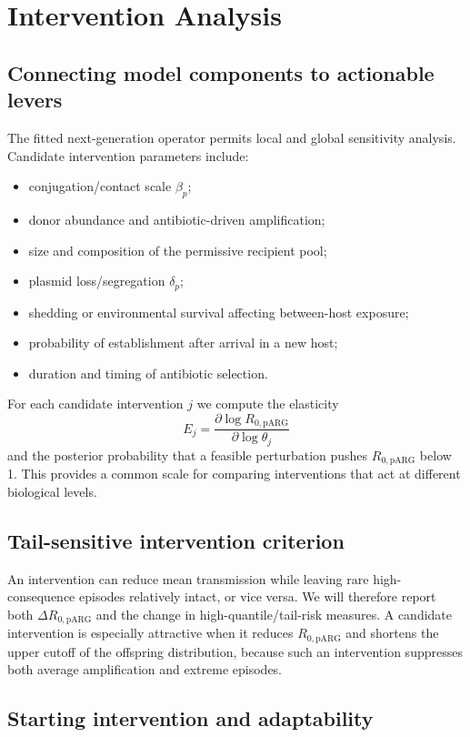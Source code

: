 \documentclass[12pt,a4paper]{article}
\newcommand{\RpARG}{R_{0,\mathrm{pARG}}}
\begin{document}
\section{Intervention Analysis}

\subsection{Connecting model components to actionable levers}

The fitted next-generation operator permits local and global sensitivity analysis. Candidate intervention parameters include:
\begin{itemize}
\item conjugation/contact scale $\beta_p$;
\item donor abundance and antibiotic-driven amplification;
\item size and composition of the permissive recipient pool;
\item plasmid loss/segregation $\delta_p$;
\item shedding or environmental survival affecting between-host exposure;
\item probability of establishment after arrival in a new host;
\item duration and timing of antibiotic selection.
\end{itemize}
For each candidate intervention $j$ we compute the elasticity
\begin{equation}
E_j=\frac{\partial\log \RpARG}{\partial\log\theta_j}
\end{equation}
and the posterior probability that a feasible perturbation pushes $\RpARG$ below 1. This provides a common scale for comparing interventions that act at different biological levels.

\subsection{Tail-sensitive intervention criterion}

An intervention can reduce mean transmission while leaving rare high-consequence episodes relatively intact, or vice versa. We will therefore report both $\Delta \RpARG$ and the change in high-quantile/tail-risk measures. A candidate intervention is especially attractive when it reduces $\RpARG$ and shortens the upper cutoff of the offspring distribution, because such an intervention suppresses both average amplification and extreme episodes.

\subsection{Starting intervention and adaptability}
\end{document}
